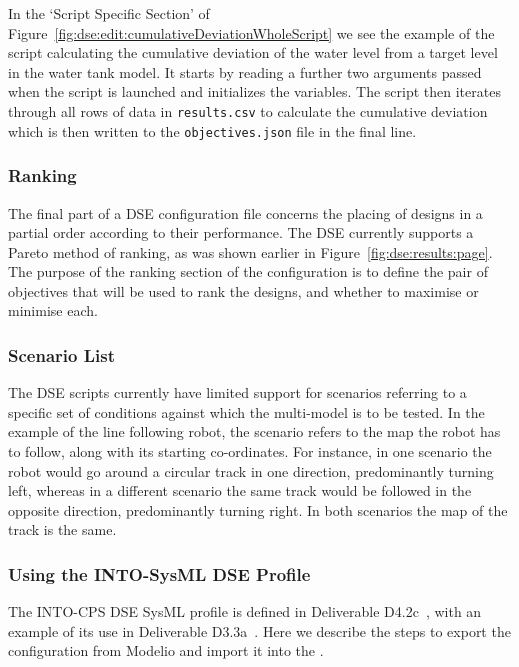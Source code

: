In the `Script Specific Section' of Figure~\ref{fig:dse:edit:cumulativeDeviationWholeScript} we see the example of the script calculating the cumulative deviation of the water level from a target level in the water tank model.  It starts by reading a further two arguments passed when the script is launched and initializes the variables.  The script then iterates through all rows of data in \texttt{results.csv} to calculate the cumulative deviation which is then written to the \texttt{objectives.json} file in the final line.
%
%
%
\subsubsection*{Ranking}\label{sec:dse:overview:ranking}
The final part of a DSE configuration file concerns the placing of designs in a partial order according to their performance.  The DSE currently supports a Pareto method of ranking, as was shown earlier in Figure~\ref{fig:dse:results:page}.  The purpose of the ranking section of the configuration is to define the pair of objectives that will be used to rank the designs, and whether to maximise or minimise each.  

\subsubsection*{Scenario List}\label{sec:dse:overview:scenarios}
The DSE scripts currently have limited support for scenarios referring to a specific set of conditions against which the multi-model is to be tested.  In the example of the line following robot, the scenario refers to the map the robot has to follow, along with its starting co-ordinates.
%
For instance, in one scenario the robot would go around a circular track in one direction, predominantly turning left, whereas in a different scenario the same track would be followed in the opposite direction, predominantly turning right.
%
In both scenarios the map of the track is the same.


%
%
%


\subsubsection{Using the INTO-SysML DSE Profile}\label{sec:dse:edit:sysml}


The INTO-CPS DSE SysML profile is defined in Deliverable D4.2c~\cite{INTOCPSD4.2c}, with an example of its use in Deliverable D3.3a~\cite{INTOCPSD3.3a}. Here we describe the steps to export the configuration from Modelio and import it into the \intoapp{}.

